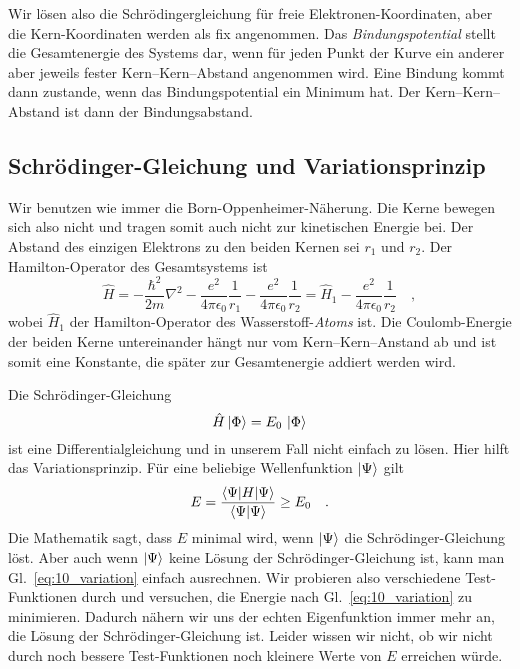 Wir lösen also die Schrödingergleichung für freie Elektronen-Koordinaten, aber die Kern-Koordinaten werden als fix angenommen. Das \emph{Bindungspotential} stellt die Gesamtenergie des Systems dar, wenn für jeden Punkt der Kurve ein anderer aber jeweils fester Kern--Kern--Abstand angenommen wird. Eine Bindung kommt dann zustande, wenn das Bindungspotential ein Minimum hat. Der Kern--Kern--Abstand ist dann der Bindungsabstand.


\subsection{Schrödinger-Gleichung und Variationsprinzip}

Wir benutzen wie immer die Born-Oppenheimer-Näherung. Die Kerne bewegen sich also nicht und tragen somit auch nicht zur kinetischen Energie bei. Der Abstand des einzigen Elektrons zu den beiden Kernen sei $r_1$ und $r_2$. Der Hamilton-Operator des Gesamtsystems ist
\begin{equation}
\hat{H} =  - \frac{\hbar^2}{2 m} \nabla^2 - \frac{e^2}{4 \pi \epsilon_0} \frac{1}{r_{1}} - \frac{e^2}{4 \pi \epsilon_0} \frac{1}{r_{2}}
= \hat{H}_1  - \frac{e^2}{4 \pi \epsilon_0} \frac{1}{r_{2}} \quad ,
\end{equation} 
wobei $\hat{H}_1 $ der Hamilton-Operator des Wasserstoff-\emph{Atoms} ist. Die Coulomb-Energie der beiden Kerne untereinander hängt nur vom Kern--Kern--Anstand ab und ist somit eine Konstante, die später zur Gesamtenergie addiert werden wird.


Die Schrödinger-Gleichung
\begin{equation}
 \hat{H} \ket{\Phi} = E_0 \, \ket{\Phi} 
\end{equation}
ist eine Differentialgleichung und in unserem Fall nicht einfach zu lösen. Hier hilft das Variationsprinzip. Für eine beliebige Wellenfunktion  $\ket{\Psi}$ gilt
\begin{equation}
 E = \frac{\braket{\Psi | H | \Psi}} {\braket{\Psi | \Psi}} \ge E_0 \quad .
 \label{eq:10_variation}
\end{equation}
Die Mathematik sagt, dass $E$ minimal wird, wenn  $\ket{\Psi}$ die Schrödinger-Gleichung löst. Aber auch wenn $\ket{\Psi}$ keine Lösung der Schrödinger-Gleichung  ist, kann man Gl.~\ref{eq:10_variation} einfach ausrechnen. Wir probieren  also verschiedene Test-Funktionen durch und versuchen, die Energie nach Gl.~\ref{eq:10_variation} zu minimieren. Dadurch nähern wir uns der echten Eigenfunktion immer mehr an, die Lösung der Schrödinger-Gleichung ist. Leider wissen wir nicht, ob wir  nicht durch noch bessere Test-Funktionen noch kleinere Werte von $E$ erreichen würde.


